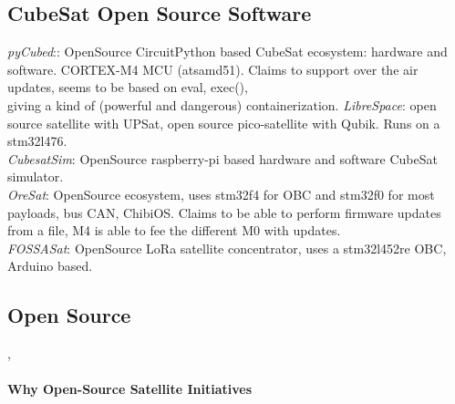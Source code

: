 \subsection{CubeSat Open Source Software}
\label{sec:open-source-cubesat}
\textit{pyCubed}:\cite{Holliday2019PyCubed}: OpenSource CircuitPython based CubeSat
ecosystem: hardware and software. CORTEX-M4 MCU (atsamd51). Claims to support
over the air updates, seems to be based on eval, exec(),\\
giving a kind of (powerful and dangerous) containerization.
\textit{LibreSpace}: \cite{librespace} open source satellite with UPSat, open source pico-satellite
with Qubik. Runs on a stm32l476.\\
\textit{CubesatSim}:\cite{amsatcubesat} OpenSource raspberry-pi based hardware and
software CubeSat simulator.\\
\textit{OreSat}\cite{spivey2021oresat}: OpenSource ecosystem, uses stm32f4 for OBC
and stm32f0 for most payloads, bus CAN, ChibiOS. Claims to be able to perform
firmware updates from a file, M4 is able to fee the different M0 with updates.\\
\textit{FOSSASat}: OpenSource LoRa satellite concentrator, uses a stm32l452re OBC,
Arduino based.\\


\subsection{Open Source} \cite{shalashov2021OpenSourceCubeSatReview}, \cite{Holliday2019PyCubed}
\paragraph*{Why Open-Source Satellite Initiatives}
